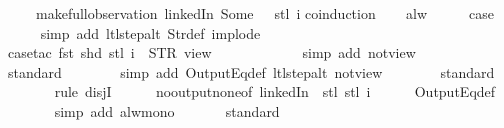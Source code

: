 \begin{isabellebody}
\ \ \ \ \ {\isacharparenleft}make{\isacharunderscore}full{\isacharunderscore}observation\ linkedIn\ {\isacharparenleft}Some\ {}{\isacharparenright}\ {\isacharless}{\isachargreater}\ {\isacharparenleft}stl\ i{\isacharparenright}{\isacharparenright}{\isachardoublequoteclose}\isanewline
%
\isadelimproof
%
\endisadelimproof
%
\isatagproof
{}\isamarkupfalse%
{\isacharparenleft}coinduction{\isacharparenright}\isanewline
\ \ \isamarkupfalse%
\ alw\isanewline
\ \ \isamarkupfalse%
\ \isamarkupfalse%
\ {\isacharquery}case\isanewline
\ \ \ \ \isamarkupfalse%
\ {\isacharparenleft}simp\ add{\isacharcolon}\ ltl{\isacharunderscore}step{\isacharunderscore}alt\ Str{\isacharunderscore}def\ implode{\isacharparenright}\isanewline
\ \ \ \ \isamarkupfalse%
\ {\isacharparenleft}case{\isacharunderscore}tac\ {\isachardoublequoteopen}{\isacharparenleft}fst\ {\isacharparenleft}shd\ {\isacharparenleft}stl\ i{\isacharparenright}{\isacharparenright}{\isacharparenright}\ {\isacharequal}\ STR\ {\isacharprime}{\isacharprime}view{\isacharprime}{\isacharprime}{\isachardoublequoteclose}{\isacharparenright}\isanewline
\ \ \ \ \ \isamarkupfalse%
\isanewline
\ \ \ \ \ \isamarkupfalse%
\ {\isacharparenleft}simp\ add{\isacharcolon}\ not{\isacharunderscore}view{\isacharparenright}\isanewline
\ \ \ \ \ \isamarkupfalse%
\ standard\isanewline
\ \ \ \ \ \ \isamarkupfalse%
\ {\isacharparenleft}simp\ add{\isacharcolon}\ OutputEq{\isacharunderscore}def\ ltl{\isacharunderscore}step{\isacharunderscore}alt\ not{\isacharunderscore}view{\isacharparenright}\isanewline
\ \ \ \ \ \ \isamarkupfalse%
\ standard\isanewline
\ \ \ \ \ \ \isamarkupfalse%
\ {\isacharparenleft}rule\ disjI{}{\isacharparenright}\isanewline
\ \ \ \ \isamarkupfalse%
\ no{\isacharunderscore}output{\isacharunderscore}none{\isacharbrackleft}of\ linkedIn\ {\isachardoublequoteopen}{\isacharless}{\isachargreater}{\isachardoublequoteclose}\ {\isachardoublequoteopen}stl\ {\isacharparenleft}stl\ i{\isacharparenright}{\isachardoublequoteclose}{\isacharbrackright}\isanewline
\ \ \ \ \isamarkupfalse%
\ OutputEq{\isacharunderscore}def\isanewline
\ \ \ \ \ \ \isamarkupfalse%
\ {\isacharparenleft}simp\ add{\isacharcolon}\ alw{\isacharunderscore}mono{\isacharparenright}\isanewline
\ \ \ \ \ \isamarkupfalse%
\ standard\isanewline
\ \ \ \ \ \ \isamarkupfalse%

\end{isabellebody}
